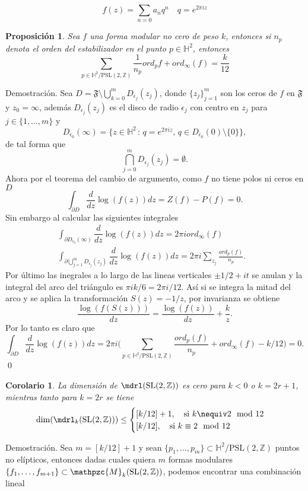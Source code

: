\documentclass[letterpaper]{article}
\newtheorem{prop}[teorema]{Proposici\'on}
\newtheorem{cor}[teorema]{Corolario}
\newcommand{\dem}{{\noindent \sc Demostraci\'on. }}
\newcommand{\slz}{\ensuremath{\mathrm{SL}(2,\mathbb Z) }}
\newcommand{\pslz}{\ensuremath{\mathrm{PSL}(2,\mathbb Z) }}
\newcommand{\hd}{\ensuremath{\mathbb H^2}}
\newcommand{\mdlr}{\ensuremath{\mathpzc{M}}}
\begin{document}
\[
    f(z)=\sum_{n=0}a_nq^n\quad q=e^{2\pi iz}
\]
\begin{prop}
Sea $f$ una forma modular no cero de peso $k$, entonces si $n_p$ denota el orden del estabilizador en el punto \(p\in\hd\), entonces
\begin{equation}\label{mod-dim}
\sum_{p\in\hd/\pslz}\frac{1}{n_p}ord_p{f}+ord_{\infty}(f)=\frac{k}{12}
\end{equation}
\end{prop}
\dem Sea \(D=\mathfrak{F}\setminus\bigcup_{k=0}^{m}D_{\epsilon_j}(z_j)\), donde \(\{z_j\}_{j=1}^m\) son los ceros de \(f\) en \(\mathfrak{F}\) y \(z_0=\infty\), además \(D_{\epsilon_{j}}(z_j)\) es el disco de radio \(\epsilon_j\) con centro en \(z_j\) para \(j\in\{1,\dots,m\}\) y
\[
    D_{\epsilon_0}(\infty)=\{z\in\hd\,:\,q=e^{2\pi iz},\,q\in D_{\epsilon_0}(0)\setminus\{0\}\},
\]
de tal forma que
\[
    \bigcap_{j=0}^{m} D_{\epsilon_j}(z_j)=\emptyset.
\]
Ahora por el teorema del cambio de argumento, como \(f\) no tiene polos ni ceros en \(D\)
\[
    \int_{\partial D}\dfrac{d}{dz}\log(f(z))dz=Z(f)-P(f)=0.
\]
Sin embargo al calcular las siguientes integrales
\begin{align*}
    \int_{\partial D_{\epsilon_0}(\infty)}\dfrac{d}{dz}\log(f(z))dz=2\pi i ord_{\infty}(f)&\\
    \int_{\partial \bigcup_{j=1}^{m} D_{\epsilon_j}(z_j)}\dfrac{d}{dz}\log(f(z))dz=2\pi i\sum_{z_j}\frac{ord_{p}(f)}{n_p}.
\end{align*}
Por último las inegrales a lo largo de las lineas verticales \(\pm1/2+it\) se anulan y la integral del arco del triángulo es \(\pi i k/6=2\pi i/12\). Así si se integra la mitad del arco y se aplica la transformación \(S(z)=-1/z\), por invarianza se obtiene
\[
    \dfrac{\log(f(S(z)))}{dz}=\dfrac{\log(f(z))}{dz}+\frac{k}{z}.
\]
Por lo tanto es claro que
\[
    \int_{\partial D}\dfrac{d}{dz}\log(f(z))dz=2\pi i\Big(\sum_{p\in\hd/\pslz}\frac{ord_p(f)}{n_p}+ord_{\infty}(f)-k/12\Big)=0.
\]
\qed
\begin{cor}
La dimensión de $\mdrl(\slz)$ es cero para $k<0$ o $k=2r+1$, mientras tanto para $k=2r$ se tiene
\[
    \dim(\mdrl_k(\slz))\leq
\begin{cases}
    [k/12]+1,\quad\text{si }k\nequiv 2\mod 12&\\
    [k/12],\quad\text{si }k\equiv 2\mod 12\\
\end{cases}
\]
\end{cor}
\dem Sea \(m=[k/12]+1\) y sean \(\{p_1,\dots,p_m\}\subset\hd/\pslz\) puntos no elípticos, entonces dadas cuales quiera \(m\) formas modulares \(\{f_1,\dots,f_{m+1}\}\subset\mdlr_k(\slz)\), podemos encontrar una combinación lineal
\end{document}
